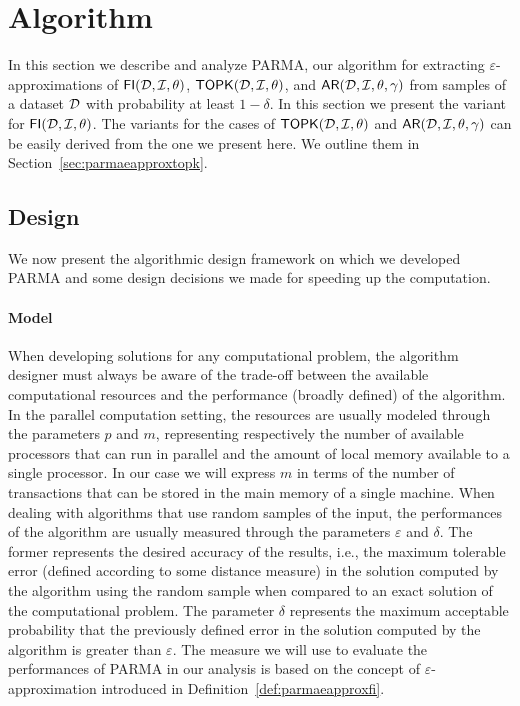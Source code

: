 \section{Algorithm}
\label{sec:parmaparmaalgo}
In this section we describe and analyze PARMA, our algorithm for extracting
$\varepsilon$-approximations of $\mathsf{FI}({\cal D},{\cal I},\theta)$,
$\mathsf{TOPK}({\cal D},{\cal I},\theta)$, and $\mathsf{AR}({\cal D},{\cal I},\theta,\gamma)$ from samples of a dataset
${\cal D}$ with probability at least $1-\delta$. In this section we present the
variant for $\mathsf{FI}({\cal D},{\cal I},\theta)$. The variants for the cases of $\mathsf{TOPK}({\cal D},{\cal I},\theta)$ and
$\mathsf{AR}({\cal D},{\cal I},\theta,\gamma)$ can be easily derived from the one
we present here. We outline them in Section~\ref{sec:parmaeapproxtopk}. 

\subsection{Design}\label{subsec:parmadesign}
We now present the algorithmic design framework on which we developed PARMA and
some design decisions we made for speeding up the computation. 

\paragraph*{Model}When developing solutions for any computational problem,
the algorithm designer must always be aware of the trade-off between the available
computational resources and the performance (broadly defined) of the algorithm.
In the parallel computation setting, the resources are usually modeled through
the parameters $p$ and $m$, representing respectively the number of available
processors that can run in parallel and the amount of local memory available to
a single processor. In our case we will express $m$ in terms of the number of
transactions that can be stored in the main memory of a single machine.
When dealing with algorithms that use random samples of the input, the
performances of the algorithm are usually measured through the parameters
$\varepsilon$ and $\delta$. The former represents the desired accuracy of the
results, i.e., the maximum tolerable error (defined according to some distance
measure) in the solution computed by the algorithm using the random sample
when compared to an exact solution of the computational problem. The parameter
$\delta$ represents the maximum acceptable probability that the previously
defined error in the solution computed by the algorithm is greater than
$\varepsilon$. The measure we will use to evaluate the performances of PARMA in
our analysis is based on the concept of $\varepsilon$-approximation introduced in
Definition~\ref{def:parmaeapproxfi}.

